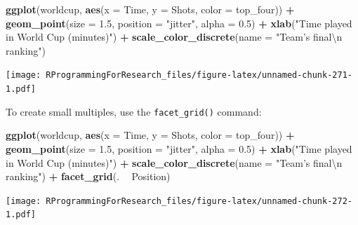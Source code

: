 \documentclass[]{book}
\makeatletter
\newenvironment{Shaded}{\begin{snugshade}}{\end{snugshade}}
\newcommand{\KeywordTok}[1]{\textcolor[rgb]{0.13,0.29,0.53}{\textbf{#1}}}
\newcommand{\DataTypeTok}[1]{\textcolor[rgb]{0.13,0.29,0.53}{#1}}
\newcommand{\FloatTok}[1]{\textcolor[rgb]{0.00,0.00,0.81}{#1}}
\newcommand{\CharTok}[1]{\textcolor[rgb]{0.31,0.60,0.02}{#1}}
\newcommand{\StringTok}[1]{\textcolor[rgb]{0.31,0.60,0.02}{#1}}
\newcommand{\OperatorTok}[1]{\textcolor[rgb]{0.81,0.36,0.00}{\textbf{#1}}}
\newcommand{\NormalTok}[1]{#1}
\newenvironment{kframe}{%
\medskip{}
\setlength{\fboxsep}{.8em}
 \def\at@end@of@kframe{}%
 \ifinner\ifhmode%
  \def\at@end@of@kframe{\end{minipage}}%
  \begin{minipage}{\columnwidth}%
 \fi\fi%
 \def\FrameCommand##1{\hskip\@totalleftmargin \hskip-\fboxsep
 \colorbox{shadecolor}{##1}\hskip-\fboxsep
     \hskip-\linewidth \hskip-\@totalleftmargin \hskip\columnwidth}%
 \MakeFramed {\advance\hsize-\width
   \@totalleftmargin\z@ \linewidth\hsize
   \@setminipage}}%
 {\par\unskip\endMakeFramed%
 \at@end@of@kframe}
\renewenvironment{Shaded}{\begin{kframe}}{\end{kframe}}
\theoremstyle{definition}
\theoremstyle{definition}
\theoremstyle{definition}
\theoremstyle{remark}
\makeatother
\begin{document}
\begin{Shaded}
\begin{Highlighting}[]
\KeywordTok{ggplot}\NormalTok{(worldcup, }\KeywordTok{aes}\NormalTok{(}\DataTypeTok{x =}\NormalTok{ Time, }\DataTypeTok{y =}\NormalTok{ Shots,}
                     \DataTypeTok{color =}\NormalTok{ top_four)) }\OperatorTok{+}
\StringTok{        }\KeywordTok{geom_point}\NormalTok{(}\DataTypeTok{size =} \FloatTok{1.5}\NormalTok{, }\DataTypeTok{position =} \StringTok{"jitter"}\NormalTok{,}
                   \DataTypeTok{alpha =} \FloatTok{0.5}\NormalTok{)  }\OperatorTok{+}\StringTok{ }
\StringTok{        }\KeywordTok{xlab}\NormalTok{(}\StringTok{"Time played in World Cup (minutes)"}\NormalTok{) }\OperatorTok{+}\StringTok{ }
\StringTok{        }\KeywordTok{scale_color_discrete}\NormalTok{(}\DataTypeTok{name =} \StringTok{"Team's final}\CharTok{\textbackslash{}n}\StringTok{ ranking"}\NormalTok{)}
\end{Highlighting}
\end{Shaded}

\texttt{[image: RProgrammingForResearch\_files/figure-latex/unnamed-chunk-271-1.pdf]}

To create small multiples, use the \texttt{facet\_grid()} command:

\begin{Shaded}
\begin{Highlighting}[]
\KeywordTok{ggplot}\NormalTok{(worldcup, }\KeywordTok{aes}\NormalTok{(}\DataTypeTok{x =}\NormalTok{ Time, }\DataTypeTok{y =}\NormalTok{ Shots,}
                     \DataTypeTok{color =}\NormalTok{ top_four)) }\OperatorTok{+}
\StringTok{        }\KeywordTok{geom_point}\NormalTok{(}\DataTypeTok{size =} \FloatTok{1.5}\NormalTok{, }\DataTypeTok{position =} \StringTok{"jitter"}\NormalTok{,}
                   \DataTypeTok{alpha =} \FloatTok{0.5}\NormalTok{)  }\OperatorTok{+}\StringTok{ }
\StringTok{        }\KeywordTok{xlab}\NormalTok{(}\StringTok{"Time played in World Cup (minutes)"}\NormalTok{) }\OperatorTok{+}\StringTok{ }
\StringTok{        }\KeywordTok{scale_color_discrete}\NormalTok{(}\DataTypeTok{name =} \StringTok{"Team's final}\CharTok{\textbackslash{}n}\StringTok{ ranking"}\NormalTok{) }\OperatorTok{+}\StringTok{ }
\StringTok{        }\KeywordTok{facet_grid}\NormalTok{(. }\OperatorTok{~}\StringTok{ }\NormalTok{Position)}
\end{Highlighting}
\end{Shaded}

\texttt{[image: RProgrammingForResearch\_files/figure-latex/unnamed-chunk-272-1.pdf]}
\end{document}
